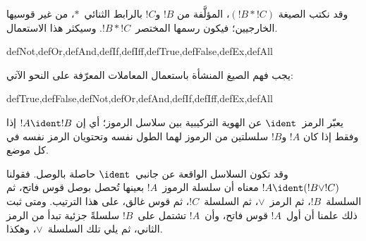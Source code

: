 \documentclass[../../../include/open-logic-section]{subfiles}
\begin{document}
وقد نكتب الصيغة $(!B \ast !C)$، المؤلَّفة من $!B$ و$!C$ بالرابط الثنائي~$\ast$، من غير قوسيها الخارجيين؛ فيكون رسمها المختصر~$!B \ast !C$. وسيكثر هذا الاستعمال.

\begin{tagblock}{defNot,defOr,defAnd,defIf,defIff,defTrue,defFalse,defEx,defAll}
\begin{defn}
يجب فهم الصيغ المنشأة باستعمال المعاملات المعرّفة على النحو الآتي:

\begin{tagenumerate}{defTrue,defFalse,defNot,defOr,defAnd,defIf,defIff,defEx,defAll}







\end{tagenumerate}
\end{defn}
\end{tagblock}

\begin{defn}
يعبّر الرمز~$\ident$ عن الهوية التركيبية بين سلاسل الرموز؛ أي إن
$!A \ident !B$ إذا وفقط إذا كان $!A$ و$!B$ سلسلتين من الرموز لهما
الطول نفسه وتحتويان الرمز نفسه في كل موضع.
\end{defn}

وقد تكون السلاسل الواقعة عن جانبي~$\ident$ حاصلة بالوصل. فقولنا
$!A \ident (!B \lor !C)$ معناه أن سلسلة الرموز~$!A$ بعينها تُحصل بوصل قوس فاتح، ثم السلسلة~$!B$، ثم الرمز~$\lor$، ثم السلسلة~$!C$، ثم قوس غالق، على هذا الترتيب. ومتى ثبت ذلك علمنا أن أول~$!A$ قوس فاتح، وأن~$!A$ تشتمل على~$!B$ سلسلةً جزئية تبدأ من الرمز الثاني، ثم يلي تلك السلسلة~$\lor$، وهكذا.
\end{document}
